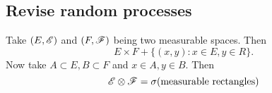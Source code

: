 \documentclass[crop=false, class=article]{standalone}
\begin{document}
\subsection{Revise random processes}
Take $(E,\mathscr{E})$ and $(F,\mathscr{F})$ being two measurable spaces. Then
\begin{equation*}
	E\times F+\{(x,y):x\in E,y\in R\}.
\end{equation*}
Now take $A\subset E,B\subset F$ and $x\in A,y\in B$. Then
\begin{equation*}
	\mathscr{E}\otimes\mathscr{F}=\sigma(\text{measurable rectangles})
\end{equation*}
\end{document}
